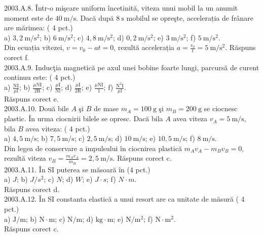 2003.A.8. Într-o mişcare uniform încetinită, viteza unui mobil la un anumit moment este de $40 \mathrm{~m} / \mathrm{s}$. Dacă după $8 \mathrm{~s}$ mobilul se opreşte, accelerația de frânare are mărimea: ( 4 pct.)\\ a) $3,2 \mathrm{~m} / \mathrm{s}^{2}$; b) $6 \mathrm{~m} / \mathrm{s}^{2}$; c) $4,8 \mathrm{~m} / \mathrm{s}^{2}$; d) $0,2 \mathrm{~m} / \mathrm{s}^{2}$; e) $3 \mathrm{~m} / \mathrm{s}^{2}$; f) $5 \mathrm{~m} / \mathrm{s}^{2}$.\\ Din ecuația vitezei, $v=v_{0}-a t=0$, rezultă accelerația $a=\frac{v_{0}}{t}=5 \mathrm{~m} / \mathrm{s}^{2}$. Răspuns corect f.\\

2003.A.9. Inducţia magnetică pe axul unei bobine foarte lungi, parcursă de curent continuu este: ( 4 pct.)\\ a) $\frac{\mathrm{NI}}{\mu \mathrm{l}}$; b) $\frac{\mu \mathrm{NI}}{2 \mathrm{R}}$; c) $\frac{\mu \mathrm{I}}{\mathrm{Nl}}$; d) $\frac{\mu \mathrm{I}}{2 \mathrm{R}}$; e) $\frac{\mu \mathrm{NI}}{1}$; f) $\frac{\mathrm{N}^{2} \mathrm{I}}{\mu \mathrm{l}}$.\\ Răspuns corect e.\\

2003.A.10. Două bile $A$ şi $B$ de mase $m_{A}=100 \mathrm{~g}$ şi $m_{B}=200 \mathrm{~g}$ se ciocnesc plastic. În urma ciocnirii bilele se opresc. Dacă bila $A$ avea viteza $v_{A}=5 \mathrm{~m} / \mathrm{s}$, bila $B$ avea viteza: ( 4 pct.)\\ a) $4,5 \mathrm{~m} / \mathrm{s}$; b) $7,5 \mathrm{~m} / \mathrm{s}$; c) $2,5 \mathrm{~m} / \mathrm{s}$; d) $10 \mathrm{~m} / \mathrm{s}$; e) $10,5 \mathrm{~m} / \mathrm{s}$; f) $8 \mathrm{~m} / \mathrm{s}$.\\ Din legea de conservare a impulsului în ciocnirea plastică $m_{A} v_{A}-m_{B} v_{B}=0$, rezultă viteza $v_{B}=\frac{m_{A} v_{A}}{m_{B}}=2,5 \mathrm{~m} / \mathrm{s}$. Răspuns corect c.\\

2003.A.11. În SI puterea se măsoară în (4 pct.)\\ a) $J$; b) $J / s^{2}$; c) $N$; d) $W$; e) $J \cdot s$; f) $N \cdot m$.\\ Răspuns corect d.\\

2003.A.12. În SI constanta elastică a unui resort are ca unitate de măsură ( 4 pct.)\\ a) $\mathrm{J} / \mathrm{m}$; b) $\mathrm{N} \cdot \mathrm{m}$; c) $\mathrm{N} / \mathrm{m}$; d) $\mathrm{kg} \cdot \mathrm{m}$; e) $\mathrm{N} / \mathrm{m}^{2}$; f) $\mathrm{N} \cdot \mathrm{m}^{2}$.\\ Răspuns corect c.\\

